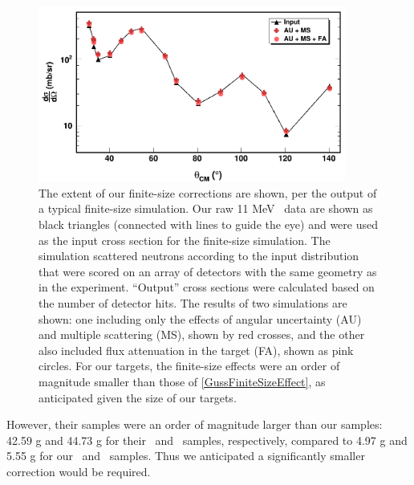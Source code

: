 \begin{figure}[ht!]
    \centering
    \includegraphics[width=0.9\textwidth]{figures/finiteSizeCorrections.png}
    \caption[Effect of finite-size corrections on our neutron \el\ measurement]
    {
        The extent of our finite-size corrections are shown, per the output
        of a typical finite-size simulation. Our raw 11 MeV \snFour \el\ data
        are shown as black triangles (connected with lines to guide the eye) and
        were used as the input cross section for the finite-size simulation.
        The simulation scattered neutrons according to the input distribution
        that were scored on an array of detectors with the same geometry
        as in the experiment. ``Output'' cross sections were calculated based on
        the number of detector hits. The results of two simulations are shown:
        one including only the effects of
        angular uncertainty (AU) and multiple scattering (MS), shown by red
        crosses, and the other also included flux attenuation in the target
        (FA), shown as pink circles. For our targets, the finite-size effects
        were an order of magnitude smaller than those of
        \ref{GussFiniteSizeEffect}, as anticipated given the size of our targets.
    }
    \label{finiteSizeCorrections}
\end{figure}
However, their samples
were an order of magnitude larger than our
samples: 42.59 g and 44.73 g for their \snSixteen\ and \snTwenty\ samples,
respectively, compared to 4.97 g and 5.55 g for our \snTwelve\ and \snFour\
samples. Thus we anticipated a significantly smaller correction would be
required.
